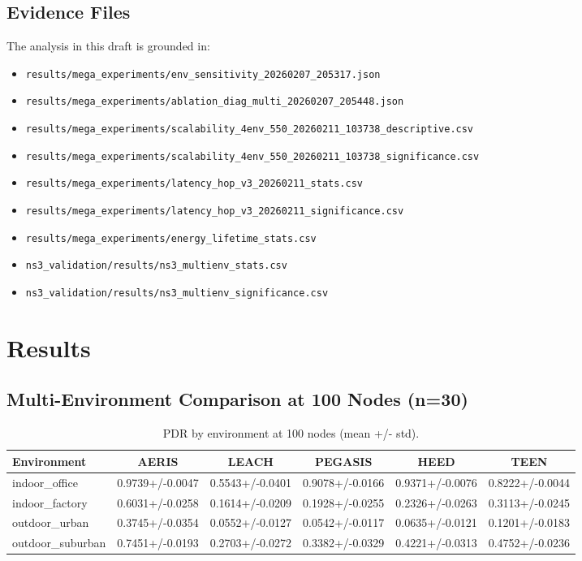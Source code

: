 \documentclass[sensors,article,submit,moreauthors,pdftex]{Definitions/mdpi}
\begin{document}
\subsection{Evidence Files}
The analysis in this draft is grounded in:
\begin{itemize}
\item \texttt{results/mega\_experiments/env\_sensitivity\_20260207\_205317.json}
\item \texttt{results/mega\_experiments/ablation\_diag\_multi\_20260207\_205448.json}
\item \texttt{results/mega\_experiments/scalability\_4env\_550\_20260211\_103738\_descriptive.csv}
\item \texttt{results/mega\_experiments/scalability\_4env\_550\_20260211\_103738\_significance.csv}
\item \texttt{results/mega\_experiments/latency\_hop\_v3\_20260211\_stats.csv}
\item \texttt{results/mega\_experiments/latency\_hop\_v3\_20260211\_significance.csv}
\item \texttt{results/mega\_experiments/energy\_lifetime\_stats.csv}
\item \texttt{ns3\_validation/results/ns3\_multienv\_stats.csv}
\item \texttt{ns3\_validation/results/ns3\_multienv\_significance.csv}
\end{itemize}

\section{Results}
\subsection{Multi-Environment Comparison at 100 Nodes (n=30)}
\begin{table}[H]
\caption{PDR by environment at 100 nodes (mean +/- std).}
\label{tab:pdr100}
\centering
\begin{tabular}{lccccc}
\toprule
Environment & AERIS & LEACH & PEGASIS & HEED & TEEN \\
\midrule
indoor\_office   & 0.9739+/-0.0047 & 0.5543+/-0.0401 & 0.9078+/-0.0166 & 0.9371+/-0.0076 & 0.8222+/-0.0044 \\
indoor\_factory  & 0.6031+/-0.0258 & 0.1614+/-0.0209 & 0.1928+/-0.0255 & 0.2326+/-0.0263 & 0.3113+/-0.0245 \\
outdoor\_urban   & 0.3745+/-0.0354 & 0.0552+/-0.0127 & 0.0542+/-0.0117 & 0.0635+/-0.0121 & 0.1201+/-0.0183 \\
outdoor\_suburban& 0.7451+/-0.0193 & 0.2703+/-0.0272 & 0.3382+/-0.0329 & 0.4221+/-0.0313 & 0.4752+/-0.0236 \\
\bottomrule
\end{tabular}
\end{table}
\end{document}
